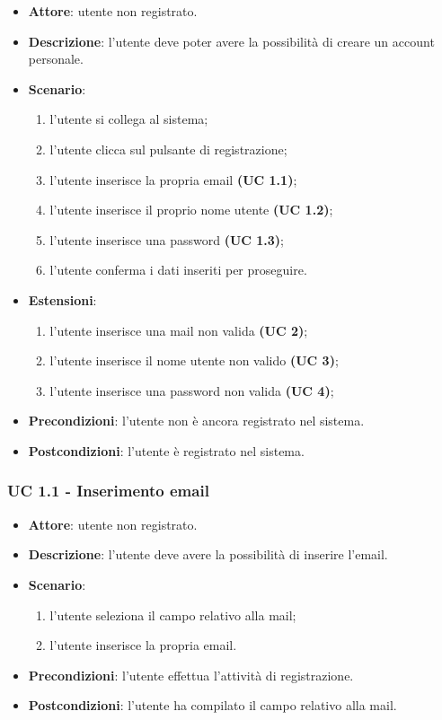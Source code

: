 \begin{itemize}
    \item \textbf{Attore}: utente non registrato.
    \item \textbf{Descrizione}: l’utente deve poter avere la possibilità di creare un account personale.
    \item \textbf{Scenario}:
    \begin{enumerate}
        \item l’utente si collega al sistema;
        \item l’utente clicca sul pulsante di registrazione;
        \item l’utente inserisce la propria email \textbf{(UC 1.1)};
        \item l’utente inserisce il proprio nome utente \textbf{(UC 1.2)};
        \item l’utente inserisce una password \textbf{(UC 1.3)};
        \item l’utente conferma i dati inseriti per proseguire.
    \end{enumerate}
    \item \textbf{Estensioni}: 
        \begin{enumerate}
            \item l’utente inserisce una mail non valida  \textbf{(UC 2)};
            \item l’utente inserisce il nome utente non valido \textbf{(UC 3)};
            \item l’utente inserisce una password non valida \textbf{(UC 4)};
        \end{enumerate}

    \item \textbf{Precondizioni}: l’utente non è ancora registrato nel sistema.
    \item \textbf{Postcondizioni}: l’utente è registrato nel sistema.
\end{itemize}

\subsubsection{UC 1.1 - Inserimento email}
\begin{itemize}
    \item \textbf{Attore}: utente non registrato.
    \item \textbf{Descrizione}: l’utente deve avere la possibilità di inserire l’email.
    \item \textbf{Scenario}:
    \begin{enumerate}
        \item l’utente seleziona il campo relativo alla mail;
        \item l’utente inserisce la propria email.
    \end{enumerate}

    \item \textbf{Precondizioni}: l’utente effettua l’attività di registrazione.
    \item \textbf{Postcondizioni}: l’utente ha compilato il campo relativo alla mail.
\end{itemize}

